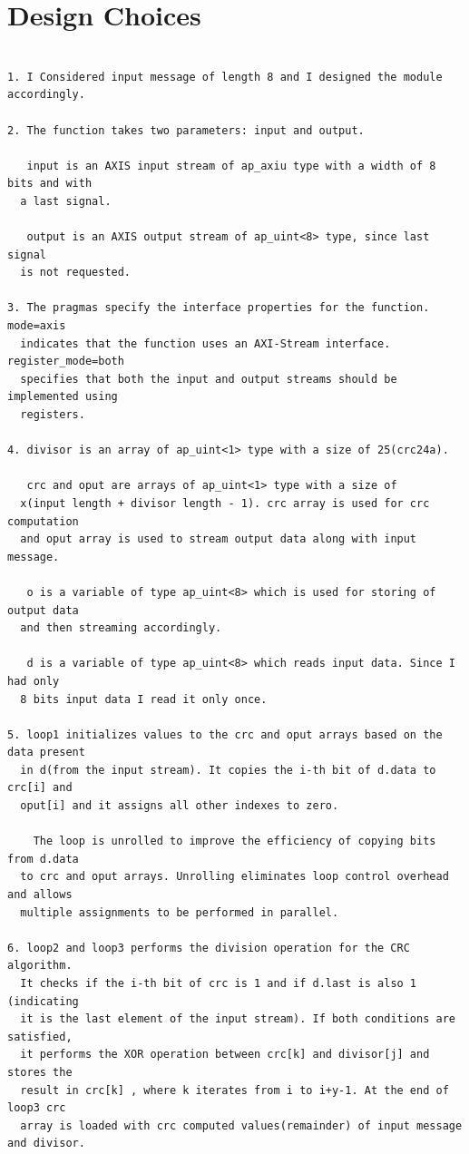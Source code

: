 \documentclass{article}
\begin{document}
\section{Design Choices}
\begin{lstlisting}

1. I Considered input message of length 8 and I designed the module accordingly.

2. The function takes two parameters: input and output.

   input is an AXIS input stream of ap_axiu type with a width of 8 bits and with 
  a last signal.
  
   output is an AXIS output stream of ap_uint<8> type, since last signal
  is not requested.

3. The pragmas specify the interface properties for the function. mode=axis
  indicates that the function uses an AXI-Stream interface. register_mode=both
  specifies that both the input and output streams should be implemented using
  registers.

4. divisor is an array of ap_uint<1> type with a size of 25(crc24a).

   crc and oput are arrays of ap_uint<1> type with a size of 
  x(input length + divisor length - 1). crc array is used for crc computation 
  and oput array is used to stream output data along with input message.
  
   o is a variable of type ap_uint<8> which is used for storing of output data 
  and then streaming accordingly.
  
   d is a variable of type ap_uint<8> which reads input data. Since I had only
  8 bits input data I read it only once.

5. loop1 initializes values to the crc and oput arrays based on the data present
  in d(from the input stream). It copies the i-th bit of d.data to crc[i] and
  oput[i] and it assigns all other indexes to zero. 
  
    The loop is unrolled to improve the efficiency of copying bits from d.data
  to crc and oput arrays. Unrolling eliminates loop control overhead and allows 
  multiple assignments to be performed in parallel.
  
6. loop2 and loop3 performs the division operation for the CRC algorithm.
  It checks if the i-th bit of crc is 1 and if d.last is also 1 (indicating 
  it is the last element of the input stream). If both conditions are satisfied,
  it performs the XOR operation between crc[k] and divisor[j] and stores the 
  result in crc[k] , where k iterates from i to i+y-1. At the end of loop3 crc 
  array is loaded with crc computed values(remainder) of input message and divisor.
  

\end{lstlisting}
\end{document}

